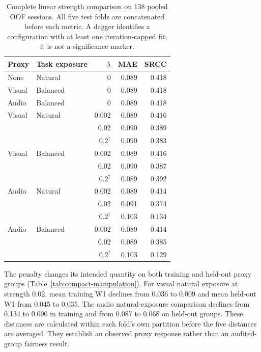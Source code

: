 \begin{table}[htbp]
\centering
\caption{Complete linear strength comparison on 138 pooled OOF sessions. All five test
folds are concatenated before each metric. A dagger identifies a configuration with at
least one iteration-capped fit; it is not a significance marker.}
\label{tab:compact-grid}
\small
\begin{tabular}{llrrr}
\toprule
Proxy & Task exposure & $\lambda$ & MAE & SRCC \\
\midrule
None & Natural & 0 & 0.089 & 0.418 \\
Visual & Balanced & 0 & 0.089 & 0.418 \\
Audio & Balanced & 0 & 0.089 & 0.418 \\
\addlinespace
Visual & Natural & 0.002 & 0.089 & 0.416 \\
 & & 0.02 & 0.090 & 0.389 \\
 & & $0.2^{\dagger}$ & 0.090 & 0.383 \\
Visual & Balanced & 0.002 & 0.089 & 0.416 \\
 & & 0.02 & 0.090 & 0.387 \\
 & & $0.2^{\dagger}$ & 0.089 & 0.392 \\
\addlinespace
Audio & Natural & 0.002 & 0.089 & 0.414 \\
 & & 0.02 & 0.091 & 0.374 \\
 & & $0.2^{\dagger}$ & 0.103 & 0.134 \\
Audio & Balanced & 0.002 & 0.089 & 0.414 \\
 & & 0.02 & 0.089 & 0.385 \\
 & & $0.2^{\dagger}$ & 0.103 & 0.129 \\
\bottomrule
\end{tabular}
\end{table}
\FloatBarrier

The penalty changes its intended quantity on both training and held-out proxy groups
(Table~\ref{tab:compact-manipulation}). For visual natural exposure at strength 0.02,
mean training W1 declines from 0.036 to 0.009 and mean held-out W1 from 0.045 to 0.035.
The audio natural-exposure comparison declines from 0.134 to 0.090 in training and from
0.087 to 0.068 on held-out groups. These distances are calculated within each fold's
own partition before the five distances are averaged. They establish an observed proxy
response rather than an audited-group fairness result.

